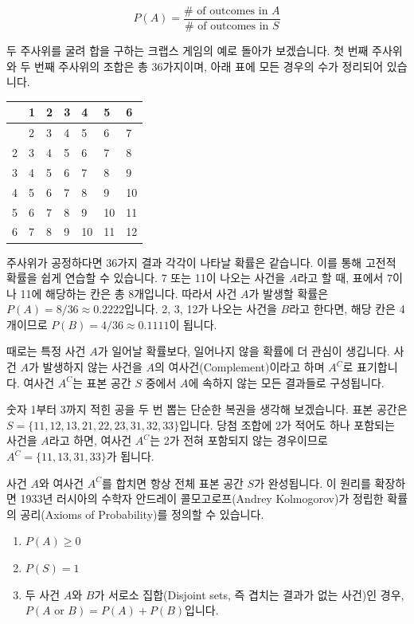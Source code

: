 \documentclass[
]{scrbook}
\newcounter{none} %
\providecommand{\tightlist}{%
  \setlength{\itemsep}{0pt}\setlength{\parskip}{0pt}}
\begin{document}
\[
P(A) = \frac{\text{# of outcomes in } A}{\text{# of outcomes in } S}
\]

두 주사위를 굴려 합을 구하는 크랩스 게임의 예로 돌아가 보겠습니다. 첫
번째 주사위와 두 번째 주사위의 조합은 총 36가지이며, 아래 표에 모든
경우의 수가 정리되어 있습니다.

{\def\LTcaptype{none} %
\begin{longtable}[]{@{}lllllll@{}}
\toprule\noalign{}
& 1 & 2 & 3 & 4 & 5 & 6 \\
\midrule\noalign{}
\endhead
\bottomrule\noalign{}
\endlastfoot
1 & 2 & 3 & 4 & 5 & 6 & 7 \\
2 & 3 & 4 & 5 & 6 & 7 & 8 \\
3 & 4 & 5 & 6 & 7 & 8 & 9 \\
4 & 5 & 6 & 7 & 8 & 9 & 10 \\
5 & 6 & 7 & 8 & 9 & 10 & 11 \\
6 & 7 & 8 & 9 & 10 & 11 & 12 \\
\end{longtable}
}

주사위가 공정하다면 36가지 결과 각각이 나타날 확률은 같습니다. 이를 통해
고전적 확률을 쉽게 연습할 수 있습니다. 7 또는 11이 나오는 사건을
\(A\)라고 할 때, 표에서 7이나 11에 해당하는 칸은 총 8개입니다. 따라서
사건 \(A\)가 발생할 확률은 \(P(A) = 8/36 \approx 0.2222\)입니다. 2, 3,
12가 나오는 사건을 \(B\)라고 한다면, 해당 칸은 4개이므로
\(P(B) = 4/36 \approx 0.1111\)이 됩니다.

때로는 특정 사건 \(A\)가 일어날 확률보다, 일어나지 않을 확률에 더 관심이
생깁니다. 사건 \(A\)가 발생하지 않는 사건을 \(A\)의
여사건(Complement)이라고 하며 \(A^C\)로 표기합니다. 여사건 \(A^C\)는
표본 공간 \(S\) 중에서 \(A\)에 속하지 않는 모든 결과들로 구성됩니다.

숫자 1부터 3까지 적힌 공을 두 번 뽑는 단순한 복권을 생각해 보겠습니다.
표본 공간은 \(S=\{11, 12, 13, 21, 22, 23, 31, 32, 33\}\)입니다. 당첨
조합에 2가 적어도 하나 포함되는 사건을 \(A\)라고 하면, 여사건 \(A^C\)는
2가 전혀 포함되지 않는 경우이므로 \(A^C=\{11, 13, 31, 33\}\)가 됩니다.

사건 \(A\)와 여사건 \(A^C\)를 합치면 항상 전체 표본 공간 \(S\)가
완성됩니다. 이 원리를 확장하면 1933년 러시아의 수학자 안드레이
콜모고로프(Andrey Kolmogorov)가 정립한 확률의 공리(Axioms of
Probability)를 정의할 수 있습니다.

\begin{enumerate}
\def\labelenumi{\arabic{enumi}.}
\tightlist
\item
  \(P(A) \ge 0\)
\item
  \(P(S) = 1\)
\item
  두 사건 \(A\)와 \(B\)가 서로소 집합(Disjoint sets, 즉 겹치는 결과가
  없는 사건)인 경우, \(P(A \text{ or } B) = P(A) + P(B)\)입니다.
\end{enumerate}
\end{document}

